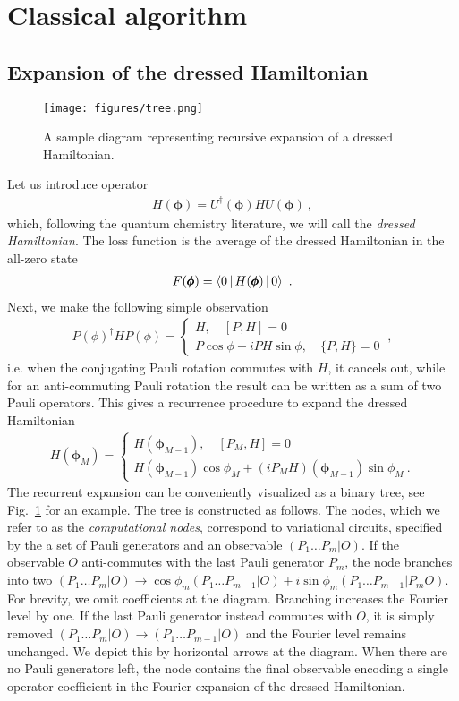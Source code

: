 \documentclass[twocolumn, amsfonts, amssymb, aps, nofootinbib]{revtex4-2}
\begin{document}
\section{Classical algorithm}
\subsection{Expansion of the dressed Hamiltonian}
\begin{figure}
	\texttt{[image: figures/tree.png]}
	\caption{A sample diagram representing recursive expansion of a dressed Hamiltonian.}
	\label{fig tree}
\end{figure}


Let us introduce operator
\begin{align}
	H(\pmb\phi)=U^\dagger(\pmb\phi)HU(\pmb\phi)\ ,
\end{align}
which, following the quantum chemistry literature, we will call the \textit{dressed Hamiltonian}. The loss function is the average of the dressed Hamiltonian in the all-zero state
\begin{align}
	 F(\pmb\phi)=\Braket{0|H(\pmb\phi)|0} \ . \label{F from H dressed}
\end{align}
Next, we make the following simple observation
\begin{align}
	P(\phi)^\dagger HP(\phi)=\begin{cases} H,\quad [P, H]=0\\ P\cos\phi+iPH\sin\phi,\quad \{P,H\}=0\end{cases} \ ,
\end{align}
i.e. when the conjugating Pauli rotation commutes with $H$, it cancels out, while for an anti-commuting Pauli rotation the result can be written as a sum of two Pauli operators. This gives a recurrence procedure to expand the dressed Hamiltonian
\begin{align}
H(\pmb\phi_M)=\begin{cases} H(\pmb\phi_{M-1}),\quad [P_M, H]=0\\ H(\pmb\phi_{M-1})\cos\phi_M+(iP_MH)(\pmb\phi_{M-1})\sin\phi_M \ .\end{cases} \label{H cases}
\end{align}
The recurrent expansion can be conveniently visualized as a binary tree, see Fig.~\ref{fig tree} for an example. The tree is constructed as follows. The nodes, which we refer to as the \textit{computational nodes}, correspond to variational circuits, specified by the a set of Pauli generators and an observable $(P_1\dots P_m|O)$. If the observable $O$ anti-commutes with the last Pauli generator $P_m$, the node branches into two $(P_1\dots P_m|O)\to\cos\phi_m (P_1\dots P_{m-1}|O)+i\sin\phi_m (P_1\dots P_{m-1}|P_m O)$. For brevity, we omit coefficients at the diagram. Branching increases the Fourier level by one. If the last Pauli generator instead commutes with $O$, it is simply removed $(P_1\dots P_m|O)\to (P_1\dots P_{m-1}|O)$ and the Fourier level remains unchanged. We depict this by horizontal arrows at the diagram. When there are no Pauli generators left, the node contains the final observable encoding a single operator coefficient in the Fourier expansion of the dressed Hamiltonian. 
\end{document}
